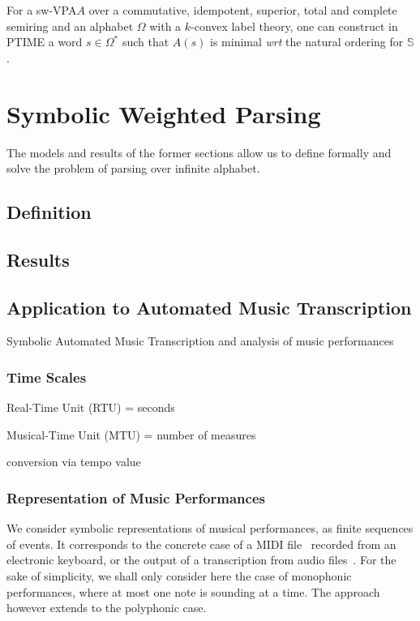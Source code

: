 \documentclass[runningheads]{llncs}
\def\wrt{\textit{wrt}\xspace}
\newcommand{\Semiring}{\mathbb{S}}
\def\SWVPA{\textsf{sw-VPA}\xspace}
\begin{document}
\begin{proposition}
For a \SWVPA $A$ over a 
commutative, idempotent, superior, total and complete semiring 
and an alphabet $\Omega$ with a $k$-convex label theory,
one can construct in PTIME a word $s \in \Omega^*$ 
such that $A(s)$ is minimal \wrt the natural ordering for $\Semiring$. 
\end{proposition} 



\section{Symbolic Weighted Parsing}
\label{sec:parsing}
The models and results of the former sections allow us 
to define formally and solve the problem of parsing over infinite alphabet.





\subsection{Definition}



\subsection{Results}



\subsection{Application to Automated Music Transcription}
\label{sec:transcription}
Symbolic Automated Music Transcription
and analysis of music performances

\subsubsection{Time Scales}
Real-Time Unit (RTU) = seconds

\noindent 
Musical-Time Unit (MTU) = number of measures

\noindent 
conversion via tempo value

\subsubsection{Representation of Music Performances}
We consider symbolic representations of musical performances, as finite sequences of events.
It corresponds to the concrete case of a MIDI file~\cite{SMF} 
recorded  from an electronic keyboard, 
or the output of a transcription from audio files~\cite{Benetos18AMTsurvey}.
%
For the sake of simplicity, 
we shall only consider here the case of monophonic performances, 
where at most one note is sounding at a time. 
The approach however extends to the polyphonic case.
\end{document}
